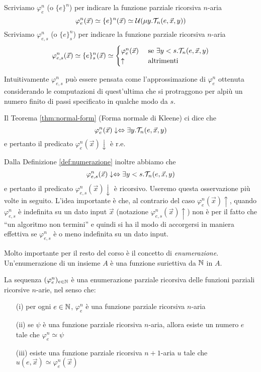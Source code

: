 \documentclass[runningheads,a4paper]{llncs}
\begin{document}
\begin{definition}\label{def:numerazione}
Scriviamo $\varphi_e^n$ (o $\{e\}^n$) per indicare la funzione parziale ricorsiva $n$-aria 
$$ \varphi_e^n(\vec x) \simeq \{e\}^n(\vec x) \simeq \mathcal{U}(\mu y.\mathcal{T}_n(e,\vec x,y))$$
Scriviamo $\varphi_{e,s}^n$ (o $\{e\}_s^n$) per indicare la funzione parziale ricorsiva $n$-aria 
$$
\varphi_{e,s}^n(\vec x) \simeq \{e\}_s^n(\vec x) \simeq
\begin{cases}
\varphi_e^n(\vec x) & \mbox{ se } \exists y<s.\mathcal{T}_n(e,\vec x,y) \\
\uparrow            & \mbox{ altrimenti} \\ 
\end{cases}
$$
\end{definition}

Intuitivamente $\varphi_{e,s}^n$ pu\`{o} essere pensata come l'approssimazione di $\varphi_{e}^n$ ottenuta considerando le computazioni
 di quest'ultima che si protraggono per alpi\`{u} un numero finito di passi specificato in qualche modo da $s$.

Il Teorema \ref{thm:normal-form} (Forma normale di Kleene) ci dice che 
$$\varphi_e^n(\vec x)\downarrow \Leftrightarrow \exists y.\mathcal{T}_n(e,\vec x,y)$$
e pertanto il predicato $\varphi_e^n(\vec x)\downarrow$ \`{e} r.e.

Dalla Definizione \ref{def:numerazione} inoltre abbiamo che 
$$\varphi_{e,s}^n(\vec x)\downarrow \Leftrightarrow \exists y<s.\mathcal{T}_n(e,\vec x,y)$$
e pertanto il predicato $\varphi_{e,s}^n(\vec x)\downarrow$ \`{e} ricorsivo. Useremo questa osservazione pi\`{u} volte in seguito.
 L'idea importante \`{e} che, al contrario del caso $\varphi_{e}^n(\vec x)\uparrow$, quando $\varphi_{e,s}^n$ \`{e} indefinita su un dato input
 $\vec x$ (notazione $\varphi_{e,s}^n(\vec x)\uparrow$) non \`{e} per il fatto che ``un algoritmo non termini'' e quindi 
 si ha il modo di accorgersi in maniera effettiva se $\varphi_{e,s}^n$ \`{e} o meno indefinita su un dato input.

Molto importante per il resto del corso \`{e} il concetto di \emph{enumerazione}. Un'enumerazione di un insieme $A$ \`{e} una 
 funzione suriettiva da $\mathbb{N}$ in $A$.

\begin{theorem}\label{thm:enumeration}
La sequenza $(\varphi_e^n)_{e \in \mathbb{N}}$ \`{e} una enumerazione parziale ricorsiva delle funzioni parziali ricorsive $n$-arie, nel senso che:
\begin{itemize}
\item[(i)] per ogni $e \in \mathbb{N}$, $\varphi_e^n$ \`{e} una funzione parziale ricorsiva $n$-aria
\item[(ii)] se $\psi$ \`{e} una funzione parziale ricorsiva $n$-aria, allora esiste un numero $e$ tale che $\varphi_e^n \simeq \psi$
\item[(iii)] esiste una funzione parziale ricorsiva $n+1$-aria $u$ tale che $u(e,\vec x) \simeq \varphi_e^n(\vec x)$
\end{itemize}
\end{theorem}
\end{document}
